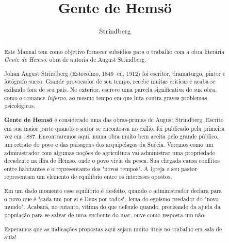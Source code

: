 \documentclass[12pt]{extarticle}
\begin{document}

\newcommand{\AutorLivro}{Strindberg}
\newcommand{\TituloLivro}{Gente de Hemsö}
\newcommand{\Tema}{Ficção, mistério e fantasia}
\newcommand{\Genero}{Romance}
\newcommand{\imagemCapa}{./images/PNLD0039-01.png}
\newcommand{\issnppub}{---}
\newcommand{\issnepub}{---}
\newcommand{\colaborador}{\textbf{Bruno Gradella e Vicente Castro} é uma pessoa incrível e vai fazer um bom serviço.}


\title{\TituloLivro}
\author{\AutorLivro}
\def\authornotes{\colaborador}

\date{}
\maketitle

\baselineskip\par

\begin{abstract}
Este Manual tem como objetivo fornecer subsídios para o trabalho com a
obra literária \emph{Gente de Hemsö}, obra de autoria de August
Strindberg.

Johan August Strindberg (Estocolmo, 1849--\textit{id.}, 1912) 
foi escritor, dramaturgo, pintor e fotógrafo sueco. Grande provocador
de seu tempo, recebe muitas críticas e acaba se exilando fora de 
seu país. No exterior, escreve uma parcela significativa de sua obra,
como o romance \textit{Inferno}, ao mesmo tempo em que luta contra graves 
problemas psicológicos.

\textbf{Gente de Hemsö} é considerado uma das obras-primas de August Strindberg. 
Escrito em sua maior parte quando o autor se encontrava no exílio, foi publicado 
pela primeira vez em 1887. Encontraremos aqui, numa obra muito bem aceita pelo grande 
público, um retrato do povo e das paisagens dos arquipélagos da Suécia.
Veremos como um administrador com algumas noções de agricultura vai administrar uma 
propriedade decadente na ilha de Hëmso, onde o povo vivia da pesca. Sua chegada causa 
conflitos entre habitantes e o representante dos "novos tempos". A Igreja e seu 
pastor representam um elemento de equilíbrio entre os interesses opostos.

Em um dado momento esse equilíbrio é desfeito, quando o administrador declara
para o povo que é "cada um por si e Deus por todos", lema do egoísmo predador
do "novo mundo". Acabará, no entanto, vítima do que defende quando, precisando
da ajuda da população para se salvar de uma enchente do mar, ouve como resposta
um não.

Esperamos que as indicações propostas aqui sejam muito úteis no trabalho em
sala de aula! 
\end{abstract}
\end{document}
